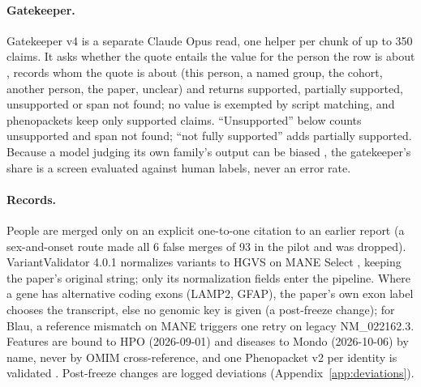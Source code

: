 \documentclass{article} %
\begin{document}
\paragraph{Gatekeeper.} Gatekeeper v4 is a separate Claude Opus read, one helper per chunk of up to 350 claims. It asks whether the quote entails the value for the person the row is about \citep{rashkin2023_ais}, records whom the quote is about (this person, a named group, the cohort, another person, the paper, unclear) and returns supported, partially supported, unsupported or span not found; no value is exempted by script matching, and phenopackets keep only supported claims. ``Unsupported'' below counts unsupported and span not found; ``not fully supported'' adds partially supported. Because a model judging its own family's output can be biased \citep{zheng2023_llm_judge}, the gatekeeper's share is a screen evaluated against human labels, never an error rate.

\paragraph{Records.} People are merged only on an explicit one-to-one citation to an earlier report (a sex-and-onset route made all 6 false merges of 93 in the pilot and was dropped). VariantValidator 4.0.1 \citep{freeman2018_variantvalidator} normalizes variants to HGVS \citep{hart2024_hgvs2024} on MANE Select \citep{morales2022_mane}, keeping the paper's original string; only its normalization fields enter the pipeline. Where a gene has alternative coding exons (LAMP2, GFAP), the paper's own exon label chooses the transcript, else no genomic key is given (a post-freeze change); for Blau, a reference mismatch on MANE triggers one retry on legacy NM\_022162.3. Features are bound to HPO (2026-09-01) and diseases to Mondo (2026-10-06) by name, never by OMIM cross-reference, and one Phenopacket v2 \citep{jacobsen2022_phenopacket_schema} per identity is validated \citep{danis2023_phenopacket_tools}. Post-freeze changes are logged deviations (Appendix~\ref{app:deviations}).
\end{document}

